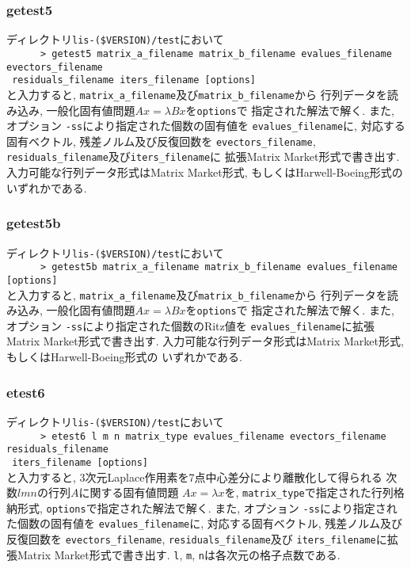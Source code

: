 \documentclass[a4paper]{jarticle}
\begin{document}
{{\subsubsection{getest5}
ディレクトリ{\tt lis-(\$VERSION)/test}において\\
 \verb+      > getest5 matrix_a_filename matrix_b_filename evalues_filename evectors_filename +\\
\verb+ residuals_filename iters_filename [options] +\\
と入力すると, {\tt matrix\_a\_filename}及び{\tt matrix\_b\_filename}から
行列データを読み込み, 一般化固有値問題$Ax=\lambda Bx$を{\tt options}で
指定された解法で解く.
また, オプション {\tt -ss}により指定された個数の固有値を
{\tt evalues\_filename}に, 対応する固有ベクトル, 残差ノルム及び反復回数を
{\tt evectors\_filename}, {\tt residuals\_filename}及び{\tt iters\_filename}に
拡張Matrix Market形式で書き出す. 
入力可能な行列データ形式はMatrix Market形式, もしくはHarwell-Boeing形式の
いずれかである. 

\subsubsection{getest5b}
ディレクトリ{\tt lis-(\$VERSION)/test}において\\
 \verb+      > getest5b matrix_a_filename matrix_b_filename evalues_filename [options] +\\
と入力すると, {\tt matrix\_a\_filename}及び{\tt matrix\_b\_filename}から
行列データを読み込み, 一般化固有値問題$Ax=\lambda Bx$を{\tt options}で
指定された解法で解く.
また, オプション {\tt -ss}により指定された個数のRitz値を
{\tt evalues\_filename}に拡張Matrix Market形式で書き出す. 
入力可能な行列データ形式はMatrix Market形式, もしくはHarwell-Boeing形式の
いずれかである. 

\subsubsection{etest6}
ディレクトリ{\tt lis-(\$VERSION)/test}において\\
 \verb+      > etest6 l m n matrix_type evalues_filename evectors_filename residuals_filename +\\
\verb+ iters_filename [options] +\\
と入力すると, 3次元Laplace作用素を7点中心差分により離散化して得られる
次数$lmn$の行列$A$に関する固有値問題
$Ax=\lambda x$を, \verb|matrix_type|で指定された行列格納形式, 
{\tt options}で指定された解法で解く.
また, オプション {\tt -ss}により指定された個数の固有値を
{\tt evalues\_filename}に, 対応する固有ベクトル, 残差ノルム及び反復回数を
{\tt evectors\_filename}, {\tt residuals\_filename}及び
{\tt iters\_filename}に拡張Matrix Market形式で書き出す. 
{\tt l}, {\tt m}, {\tt n}は各次元の格子点数である. 

}}
\end{document}
